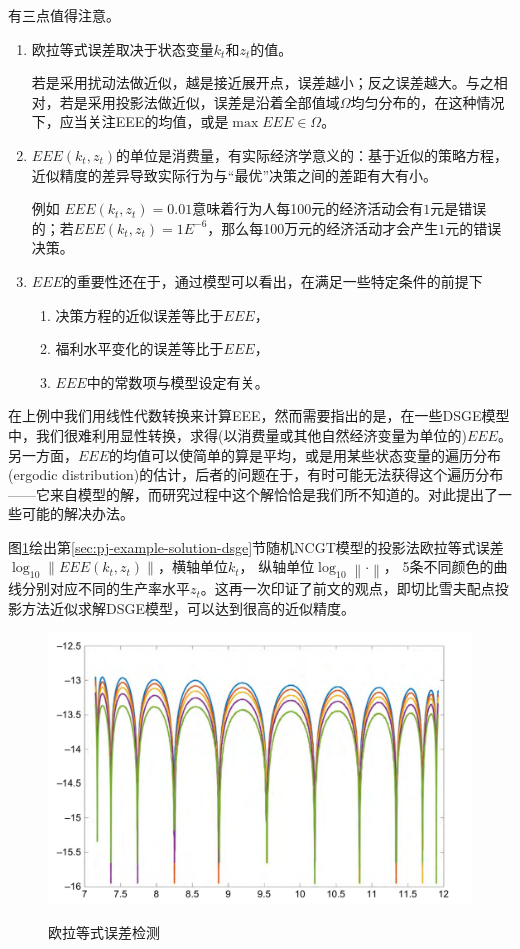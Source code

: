 有三点值得注意。
\begin{enumerate}
  \item 欧拉等式误差取决于状态变量$k_{t}$和$z_{t}$的值。

  若是采用扰动法做近似，越是接近展开点，误差越小；反之误差越大。与之相对，若是采用投影法做近似，误差是沿着全部值域$\Omega$均匀分布的，在这种情况下，应当关注EEE的均值，或是$\max EEE \in \Omega$。

  \item $EEE \left( k_{t}, z_{t} \right)$的单位是消费量，有实际经济学意义的：基于近似的策略方程，近似精度的差异导致实际行为与“最优”决策之间的差距有大有小\citep{Judd:1993dh}。

  例如 $EEE(k_{t},z_{t})=0.01$意味着行为人每100元的经济活动会有$1$元是错误的；若$EEE(k_{t},z_{t})=1E^{-6}$，那么每100万元的经济活动才会产生$1$元的错误决策。

\item $EEE$的重要性还在于，通过模型可以看出，在满足一些特定条件的前提下
\begin{enumerate}
  \item 决策方程的近似误差等比于$EEE$，
  \item 福利水平变化的误差等比于$EEE$，
  \item $EEE$中的常数项与模型设定有关\citep{Santos:2000ex}。
\end{enumerate}
\end{enumerate}

在上例中我们用线性代数转换来计算EEE，然而需要指出的是，在一些DSGE模型中，我们很难利用显性转换，求得(以消费量或其他自然经济变量为单位的)$EEE$。另一方面，$EEE$的均值可以使简单的算是平均，或是用某些状态变量的遍历分布(ergodic distribution)的估计，后者的问题在于，有时可能无法获得这个遍历分布——它来自模型的解，而研究过程中这个解恰恰是我们所不知道的。对此\cite{Aruoba:2006cz}提出了一些可能的解决办法。

图\ref{fig:error-eee-log}绘出第\ref{sec:pj-example-solution-dsge}节随机NCGT模型的投影法欧拉等式误差$\log_{10} \left\| EEE \left( k_{t}, z_{t} \right) \right\|$，横轴单位$k_{t}$，
纵轴单位$\log_{10} \left\| \cdot \right\|$，
5条不同颜色的曲线分别对应不同的生产率水平$z_{t}$。这再一次印证了前文的观点，即切比雪夫配点投影方法近似求解DSGE模型，可以达到很高的近似精度。
\begin{figure}[htbp]
   \caption{欧拉等式误差检测}
  \centering
  \includegraphics[width=12cm]{./Figures/20180328-eee-ncgt-analysis}
  \label{fig:error-eee-log}
%
\end{figure}

